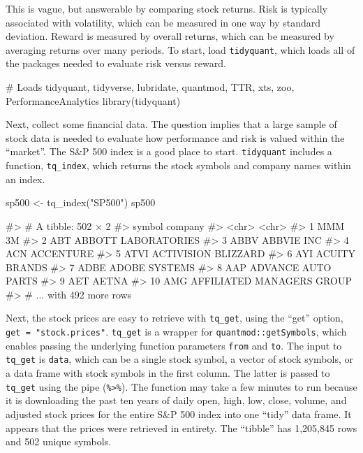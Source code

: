 This is vague, but answerable by comparing stock returns. Risk is
typically associated with volatility, which can be measured in one way
by standard deviation. Reward is measured by overall returns, which can
be measured by averaging returns over many periods. To start, load
\texttt{tidyquant}, which loads all of the packages needed to evaluate
risk versus reward.

\begin{Schunk}
\begin{Sinput}
# Loads tidyquant, tidyverse, lubridate, quantmod, TTR, xts, zoo, PerformanceAnalytics
library(tidyquant)
\end{Sinput}
\end{Schunk}

Next, collect some financial data. The question implies that a large
sample of stock data is needed to evaluate how performance and risk is
valued within the ``market''. The S\&P 500 index is a good place to
start. \texttt{tidyquant} includes a function, \texttt{tq\_index}, which
returns the stock symbols and company names within an index.

\begin{Schunk}
\begin{Sinput}
sp500 <- tq_index("SP500")
sp500
\end{Sinput}
\end{Schunk}

\begin{Schunk}
\begin{Soutput}
#> # A tibble: 502 × 2
#>    symbol                   company
#>     <chr>                     <chr>
#> 1     MMM                        3M
#> 2     ABT       ABBOTT LABORATORIES
#> 3    ABBV                ABBVIE INC
#> 4     ACN                 ACCENTURE
#> 5    ATVI       ACTIVISION BLIZZARD
#> 6     AYI             ACUITY BRANDS
#> 7    ADBE             ADOBE SYSTEMS
#> 8     AAP        ADVANCE AUTO PARTS
#> 9     AET                     AETNA
#> 10    AMG AFFILIATED MANAGERS GROUP
#> # ... with 492 more rows
\end{Soutput}
\end{Schunk}

Next, the stock prices are easy to retrieve with \texttt{tq\_get}, using
the ``get'' option, \texttt{get\ =\ "stock.prices"}. \texttt{tq\_get} is
a wrapper for \texttt{quantmod::getSymbols}, which enables passing the
underlying function parameters \texttt{from} and \texttt{to}. The input
to \texttt{tq\_get} is \texttt{data}, which can be a single stock
symbol, a vector of stock symbols, or a data frame with stock symbols in
the first column. The latter is passed to \texttt{tq\_get} using the
pipe (\texttt{\%\textgreater{}\%}). The function may take a few minutes
to run because it is downloading the past ten years of daily open, high,
low, close, volume, and adjusted stock prices for the entire S\&P 500
index into one ``tidy'' data frame. It appears that the prices were
retrieved in entirety. The ``tibble'' has 1,205,845 rows and 502 unique
symbols.

